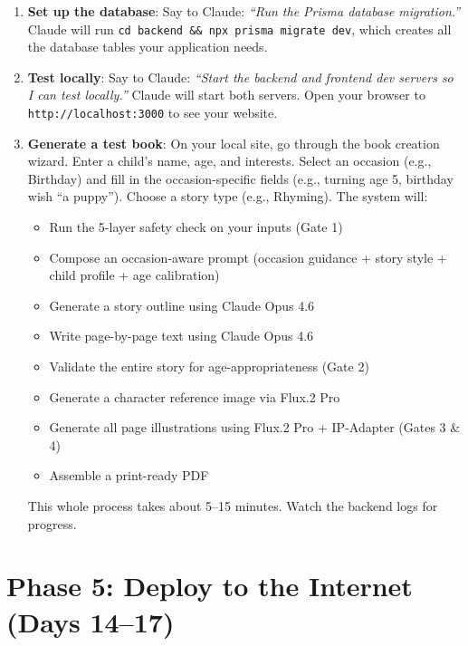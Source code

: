 \documentclass[12pt, letterpaper, oneside]{book}
\begin{document}
\begin{enumerate}[leftmargin=2em, itemsep=6pt, start=14]
  \item \textbf{Set up the database}: Say to Claude: \textit{``Run the Prisma database migration.''} Claude will run \texttt{cd backend \&\& npx prisma migrate dev}, which creates all the database tables your application needs.

  \item \textbf{Test locally}: Say to Claude: \textit{``Start the backend and frontend dev servers so I can test locally.''} Claude will start both servers. Open your browser to \texttt{http://localhost:3000} to see your website.

  \item \textbf{Generate a test book}: On your local site, go through the book creation wizard. Enter a child's name, age, and interests. Select an occasion (e.g., Birthday) and fill in the occasion-specific fields (e.g., turning age 5, birthday wish ``a puppy''). Choose a story type (e.g., Rhyming). The system will:
  \begin{itemize}[leftmargin=2em]
    \item Run the 5-layer safety check on your inputs (Gate 1)
    \item Compose an occasion-aware prompt (occasion guidance + story style + child profile + age calibration)
    \item Generate a story outline using Claude Opus 4.6
    \item Write page-by-page text using Claude Opus 4.6
    \item Validate the entire story for age-appropriateness (Gate 2)
    \item Generate a character reference image via Flux.2 Pro
    \item Generate all page illustrations using Flux.2 Pro + IP-Adapter (Gates 3 \& 4)
    \item Assemble a print-ready PDF
  \end{itemize}
  This whole process takes about 5--15 minutes. Watch the backend logs for progress.
\end{enumerate}

\section{Phase 5: Deploy to the Internet (Days 14--17)}
\end{document}
